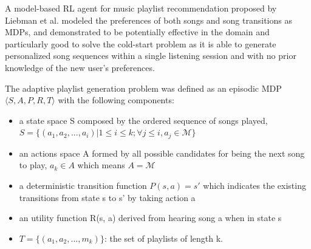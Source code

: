 %
%
%
%
%
%

A model-based RL agent for music playlist recommendation proposed by Liebman et al. \cite{liebman2015dj} modeled the preferences of both songs and song transitions as MDPs, and demonstrated to be potentially effective in the domain and particularly good to solve the cold-start problem as it is able to generate personalized song sequences within a single listening session and with no prior knowledge of the new user's preferences.

The adaptive playlist generation problem was defined as an episodic MDP $\langle S, A, P, R, T \rangle$ with the following components:
\begin{itemize}
\item a state space S composed by the ordered sequence of songs played, $S = \{(a_1, a_2, ..., a_i)|1 \leq i \leq k; \forall j \leq i, a_j \in \mathcal{M}\}$
\item an actions space A formed by all possible candidates for being the next song to play, $a_k \in A$ which means $A = \mathcal{M}$
\item a deterministic transition function $P(s, a) = s'$ which indicates the existing transitions from state s to s' by taking action a
\item an utility function R(s, a) derived from hearing song a when in state s
\item $T = \{(a_1, a_2, ..., m_k)\}$: the set of playlists of length k.
\end{itemize}

